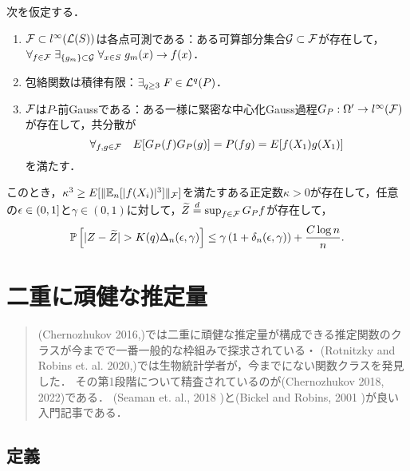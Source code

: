 \documentclass[uplatex,dvipdfmx]{jsreport}
\begin{document}
\begin{theorem}
    次を仮定する．
    \begin{enumerate}[({A}1)]
        \item $\mathcal{F}\subset l^\infty(\mathcal{L}(S))$は各点可測である：ある可算部分集合$\mathcal{G}\subset\mathcal{F}$が存在して，$\forall_{f\in\mathcal{F}}\;\exists_{\{g_m\}\subset\mathcal{G}}\;\forall_{x\in S}\;g_m(x)\to f(x)$．
        \item 包絡関数は積律有限：$\exists_{q\ge 3}\;F\in\mathcal{L}^q(P)$．
        \item $\mathcal{F}$は$P$-前Gaussである：ある一様に緊密な中心化Gauss過程$G_P:\Omega'\to l^\infty(\mathcal{F})$が存在して，共分散が
        \[\forall_{f,g\in\mathcal{F}}\quad E[G_P(f)G_P(g)]=P(fg)=E[f(X_1)g(X_1)]\]
        を満たす．
    \end{enumerate}
    このとき，$\kappa^3\ge E[\|\mathbb{E}_n[\lvert f(X_i)\rvert^3]\|_{\mathcal{F}}]$を満たすある正定数$\kappa>0$が存在して，任意の$\epsilon\in(0,1]$と$\gamma\in(0,1)$に対して，$\widetilde{Z}\overset{d}{=}\sup_{f\in\mathcal{F}}G_Pf$が存在して，
    \[\mathbb{P}\left[\lvert Z-\widetilde{Z}\rvert>K(q)\Delta_n(\epsilon,\gamma)\right]\le\gamma\left(1+\delta_n(\epsilon,\gamma)\right)+\frac{C\log n}{n}.\]
\end{theorem}

\chapter{二重に頑健な推定量}

\begin{quotation}
    (Chernozhukov 2016,\cite{Chernozhukov16})では二重に頑健な推定量が構成できる推定関数のクラスが今までで一番一般的な枠組みで探求されている・
    (Rotnitzky and Robins et. al. 2020,\cite{Rotnitzky})では生物統計学者が，今までにない関数クラスを発見した．
    その第1段階について精査されているのが(Chernozhukov 2018\cite{Chernozhukov18}, 2022\cite{Chernozhukob22})である．
    (Seaman et. al., 2018 \cite{Seaman})と(Bickel and Robins, 2001 \cite{Bickel and Robins})が良い入門記事である．
\end{quotation}

\section{定義}
\end{document}
